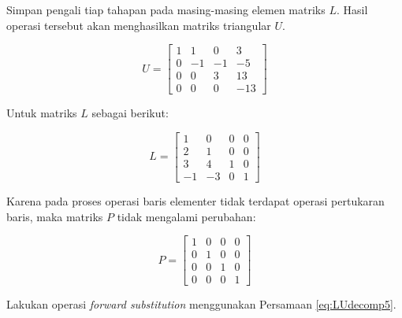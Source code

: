 \documentclass[
]{book}
\theoremstyle{definition}
\theoremstyle{definition}
\theoremstyle{definition}
\theoremstyle{definition}
\theoremstyle{remark}
\begin{document}
Simpan pengali tiap tahapan pada masing-masing elemen matriks \(L\). Hasil operasi tersebut akan menghasilkan matriks triangular \(U\).

\[
U=
\begin{bmatrix}
     1       & 1       & 0       & 3           \\[0.3em]
     0       & -1      & -1      & -5          \\[0.3em]
     0       & 0       & 3       & 13          \\[0.3em]
     0       & 0       & 0       & -13           
\end{bmatrix}
\]

Untuk matriks \(L\) sebagai berikut:

\[
L=
\begin{bmatrix}
     1         & 0       & 0       & 0           \\[0.3em]
     2         & 1       & 0       & 0           \\[0.3em]
     3         & 4       & 1       & 0           \\[0.3em]
     -1        & -3      & 0       & 1           
\end{bmatrix}
\]

Karena pada proses operasi baris elementer tidak terdapat operasi pertukaran baris, maka matriks \(P\) tidak mengalami perubahan:

\[
P=
\begin{bmatrix}
     1         & 0       & 0       & 0           \\[0.3em]
     0         & 1       & 0       & 0           \\[0.3em]
     0         & 0       & 1       & 0           \\[0.3em]
     0         & 0       & 0       & 1           
     \end{bmatrix}
\]

Lakukan operasi \emph{forward substitution} menggunakan Persamaan \eqref{eq:LUdecomp5}.
\end{document}
